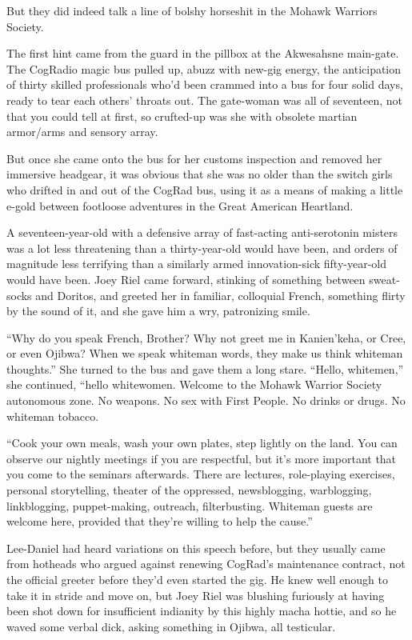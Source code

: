 But they did indeed talk a line of bolshy horseshit in the Mohawk 
Warriors Society.

The first hint came from the guard in the pillbox at the Akwesahsne 
main-gate. The CogRadio magic bus pulled up, abuzz with new-gig energy, 
the anticipation of thirty skilled professionals who'd been crammed 
into a bus for four solid days, ready to tear each others' throats out. 
The gate-woman was all of seventeen, not that you could tell at first, 
so crufted-up was she with obsolete martian armor/arms and sensory 
array.

But once she came onto the bus for her customs inspection and removed 
her immersive headgear, it was obvious that she was no older than the 
switch girls who drifted in and out of the CogRad bus, using it as a 
means of making a little e-gold between footloose adventures in the 
Great American Heartland.

A seventeen-year-old with a defensive array of fast-acting 
anti-serotonin misters was a lot less threatening than a 
thirty-year-old would have been, and orders of magnitude less 
terrifying than a similarly armed innovation-sick fifty-year-old would 
have been. Joey Riel came forward, stinking of something between 
sweat-socks and Doritos, and greeted her in familiar, colloquial 
French, something flirty by the sound of it, and she gave him a wry, 
patronizing smile.

“Why do you speak French, Brother? Why not greet me in Kanien'keha, 
or Cree, or even Ojibwa? When we speak whiteman words, they make us 
think whiteman thoughts.” She turned to the bus and gave them a long 
stare. “Hello, whitemen,” she continued, “hello whitewomen. 
Welcome to the Mohawk Warrior Society autonomous zone. No weapons. No 
sex with First People. No drinks or drugs. No whiteman tobacco.

“Cook your own meals, wash your own plates, step lightly on the land. 
You can observe our nightly meetings if you are respectful, but it's 
more important that you come to the seminars afterwards. There are 
lectures, role-playing exercises, personal storytelling, theater of the 
oppressed, newsblogging, warblogging, linkblogging, puppet-making, 
outreach, filterbusting. Whiteman guests are welcome here, provided 
that they're willing to help the cause.”

Lee-Daniel had heard variations on this speech before, but they usually 
came from hotheads who argued against renewing CogRad's maintenance 
contract, not the official greeter before they'd even started the gig. 
He knew well enough to take it in stride and move on, but Joey Riel was 
blushing furiously at having been shot down for insufficient indianity 
by this highly macha hottie, and so he waved some verbal dick, asking 
something in Ojibwa, all testicular.

